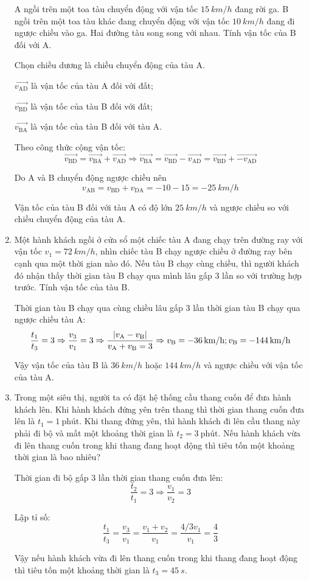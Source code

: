\begin{enumerate}[label=\bfseries Câu \arabic*:]
	\cauhoi
	{A ngồi trên một toa tàu chuyển động với vận tốc $\SI{15}{km/h}$ đang rời ga. B ngồi trên một toa tàu khác đang chuyển động với vận tốc $\SI{10}{km/h}$ đang đi ngược chiều vào ga. Hai đường tàu song song với nhau. Tính vận tốc của B đối với A.
	}
	\loigiai
	{Chọn chiều dương là chiều chuyển động của tàu A.
		
		$\overrightarrow{v_\text{AD}}$ là vận tốc của tàu A đối với đất;
		
		$\overrightarrow{v_\text{BD}}$ là vận tốc của tàu B đối với đất;
		
		$\overrightarrow{v_\text{BA}}$ là vận tốc của tàu B đối với tàu A.
		
		Theo công thức cộng vận tốc:
		$$\overrightarrow{v_\text{BD}} = \overrightarrow{v_\text{BA}}+\overrightarrow{v_\text{AD}} \Rightarrow \overrightarrow{v_\text{BA}} = \overrightarrow{v_\text{BD}} - \overrightarrow{v_\text{AD}}=\overrightarrow{v_\text{BD}} + \overrightarrow{-v_\text{AD}}$$
		
		Do A và B chuyển động ngược chiều nên
		$$v_\text{AB} = v_\text{BD} + v_\text{DA} = -10-15 = \SI{-25}{km/h}$$
		
		Vận tốc của tàu B đối với tàu A có độ lớn $\SI{25}{km/h}$ và ngược chiều so với chiều chuyển động của tàu A.
	}
	\item {}
	
	\cauhoi
	{Một hành khách ngồi ở cửa sổ một chiếc tàu A đang chạy trên đường ray với vận tốc $v_1=\SI{72}{km/h}$, nhìn chiếc tàu B chạy ngược chiều ở đường ray bên cạnh qua một thời gian nào đó. Nếu tàu B chạy cùng chiều, thì người khách đó nhận thấy thời gian tàu B chạy qua mình lâu gấp 3 lần so với trường hợp trước. Tính vận tốc của tàu B.
	}
	\loigiai
	{Thời gian tàu B chạy qua cùng chiều lâu gấp 3 lần thời gian tàu B chạy qua ngược chiều tàu A:
		$$\dfrac{t_1}{t_3} = 3 \Rightarrow \dfrac{v_3}{v_1} = 3 \Rightarrow \dfrac{|v_\text A - v_\text B|}{v_\text{A}+v_\text B = 3} \Rightarrow v_\text B = \SI{-36}{km/h}; v_\text B = \SI{-144}{km/h}$$
		
	Vậy vận tốc của tàu B là $\SI{36}{km/h}$ hoặc $\SI{144}{km/h}$ và ngược chiều với vận tốc của tàu A.
	}
	\item {}
	
	\cauhoi
	{Trong một siêu thị, người ta có đặt hệ thống cầu thang cuốn để đưa hành khách lên. Khi hành khách đứng yên trên thang thì thời gian thang cuốn đưa lên là $t_1=1\ \text{phút}$. Khi thang đứng yên, thì hành khách đi lên cầu thang này phải đi bộ và mất một khoảng thời gian là $t_2=3\ \text{phút}$. Nếu hành khách vừa đi lên thang cuốn trong khi thang đang hoạt động thì tiêu tốn một khoảng thời gian là bao nhiêu?
	}
	\loigiai
	{Thời gian đi bộ gấp 3 lần thời gian thang cuốn đưa lên:
		$$\dfrac{t_2}{t_1} = 3 \Rightarrow \dfrac{v_1}{v_2} = 3$$
		
	Lập tỉ số:
	$$\dfrac{t_1}{t_3} = \dfrac{v_3}{v_1} = \dfrac{v_1+v_2}{v_1} = \dfrac{4/3 v_1}{v_1} = \dfrac{4}{3}$$
	
	Vậy nếu hành khách vừa đi lên thang cuốn trong khi thang đang hoạt động thì tiêu tốn một khoảng thời gian là $t_3=\SI{45}{s}$.
	}
\end{enumerate}